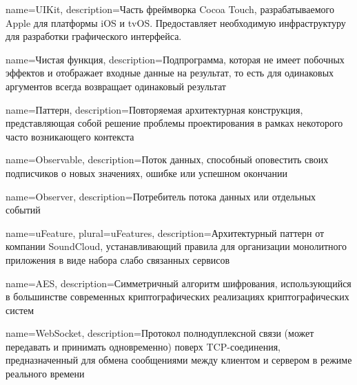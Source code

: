 

{
  name={UIKit},
  description={Часть фреймворка Cocoa Touch, разрабатываемого Apple для платформы iOS и tvOS. Предоставляет необходимую инфраструктуру для разработки графического интерфейса.}
}

{
  name={Чистая функция},
  description={Подпрограмма, которая не имеет побочных эффектов и отображает входные данные на результат, то есть для одинаковых аргументов всегда возвращает одинаковый результат}
}

{
  name={Паттерн},
  description={Повторяемая архитектурная конструкция, представляющая собой решение проблемы проектирования в рамках некоторого часто возникающего контекста}
}

{
  name=Observable,
  description={Поток данных, способный оповестить своих подписчиков о новых значениях, ошибке или успешном окончании}
}

{
  name=Observer,
  description={Потребитель потока данных или отдельных событий}
}

{
  name=uFeature,
  plural={uFeatures},
  description={Архитектурный паттерн от компании SoundCloud, устанавливающий правила для организации монолитного приложения в виде набора слабо связанных сервисов}
}

{
  name=AES,
  description={Симметричный алгоритм шифрования, использующийся в большинстве современных криптографических реализациях криптографических систем}
}

{
  name=WebSocket,
  description={Протокол полнодуплексной связи (может передавать и принимать одновременно) поверх TCP-соединения, предназначенный для обмена сообщениями между клиентом и сервером в режиме реального времени}
}


\glsaddall


